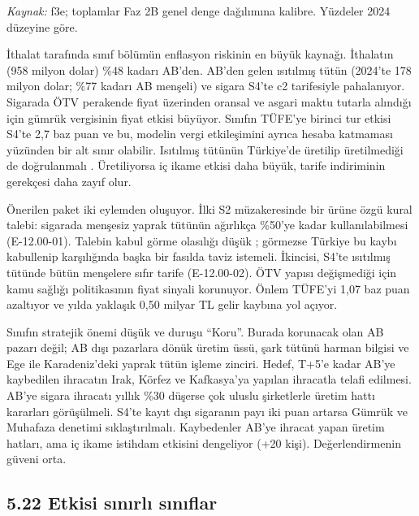 \endgroup

\emph{Kaynak:} \etiketT{} f3e; toplamlar Faz 2B genel denge dağılımına kalibre. Yüzdeler 2024 düzeyine göre.

İthalat tarafında sınıf bölümün enflasyon riskinin en büyük kaynağı. İthalatın (958 milyon dolar) \%48 kadarı AB'den. AB'den gelen ısıtılmış tütün (2024'te 178 milyon dolar; \%77 kadarı AB menşeli) ve sigara S4'te c2 tarifesiyle pahalanıyor. Sigarada ÖTV perakende fiyat üzerinden oransal ve asgari maktu tutarla alındığı için gümrük vergisinin fiyat etkisi büyüyor. Sınıfın TÜFE'ye birinci tur etkisi S4'te 2,7 baz puan ve bu, modelin vergi etkileşimini ayrıca hesaba katmaması yüzünden bir alt sınır olabilir. Isıtılmış tütünün Türkiye'de üretilip üretilmediği de doğrulanmalı \etiketD{}. Üretiliyorsa iç ikame etkisi daha büyük, tarife indiriminin gerekçesi daha zayıf olur.

Önerilen paket iki eylemden oluşuyor. İlki S2 müzakeresinde bir ürüne özgü kural talebi: sigarada menşesiz yaprak tütünün ağırlıkça \%50'ye kadar kullanılabilmesi (E-12.00-01). Talebin kabul görme olasılığı düşük \etiketH{}; görmezse Türkiye bu kaybı kabullenip karşılığında başka bir fasılda taviz istemeli. İkincisi, S4'te ısıtılmış tütünde bütün menşelere sıfır tarife (E-12.00-02). ÖTV yapısı değişmediği için kamu sağlığı politikasının fiyat sinyali korunuyor. Önlem TÜFE'yi 1,07 baz puan azaltıyor ve yılda yaklaşık 0,50 milyar TL gelir kaybına yol açıyor.

Sınıfın stratejik önemi düşük ve duruşu ``Koru''. Burada korunacak olan AB pazarı değil; AB dışı pazarlara dönük üretim üssü, şark tütünü harman bilgisi ve Ege ile Karadeniz'deki yaprak tütün işleme zinciri. Hedef, T+5'e kadar AB'ye kaybedilen ihracatın Irak, Körfez ve Kafkasya'ya yapılan ihracatla telafi edilmesi. AB'ye sigara ihracatı yıllık \%30 düşerse çok uluslu şirketlerle üretim hattı kararları görüşülmeli. S4'te kayıt dışı sigaranın payı iki puan artarsa Gümrük ve Muhafaza denetimi sıklaştırılmalı. Kaybedenler AB'ye ihracat yapan üretim hatları, ama iç ikame istihdam etkisini dengeliyor (+20 kişi). Değerlendirmenin güveni orta.

\hypertarget{nace_kartlar_10-12-522-etkisi-sux131nux131rlux131-sux131nux131flar}{%
\subsection{5.22 Etkisi sınırlı sınıflar}\label{nace_kartlar_10-12-522-etkisi-sux131nux131rlux131-sux131nux131flar}}

